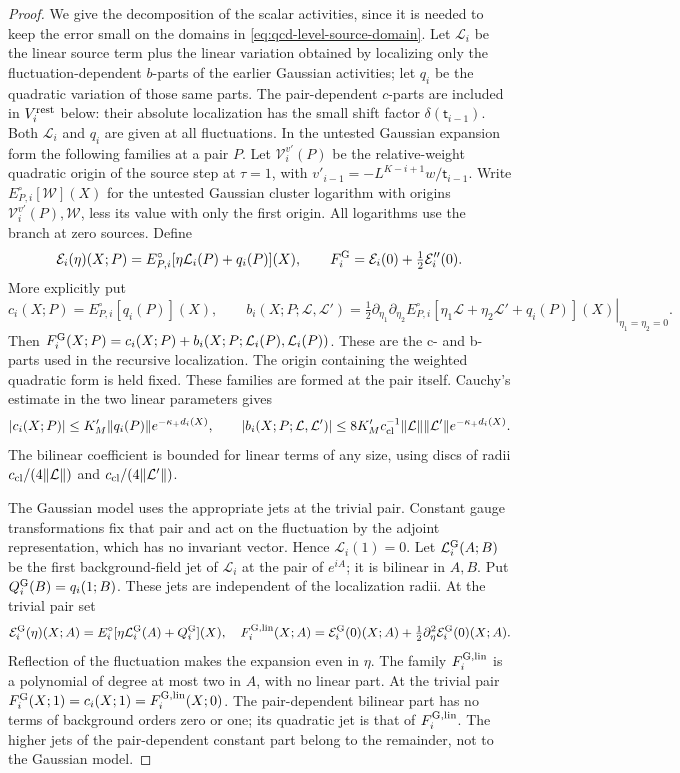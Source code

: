 \documentclass[11pt,letterpaper,reqno]{amsart}
\theoremstyle{definition}
\theoremstyle{remark}
\begin{document}
\begin{proof}
We give the decomposition of the scalar activities, since it is
needed to keep the error small on the domains in
\eqref{eq:qcd-level-source-domain}. Let $\mathcal L_i$ be the
linear source term plus the linear variation obtained by localizing
only the fluctuation-dependent $b$-parts of the earlier Gaussian
activities; let $q_i$ be the quadratic variation of those same parts.
The pair-dependent $c$-parts are included in $V_i^{\rm rest}$ below:
their absolute localization has the small shift factor
$\delta(\mathsf t_{i-1})$. Both $\mathcal L_i$ and $q_i$ are given at all
fluctuations. In the untested Gaussian expansion form
the following families at a pair $P$. Let
$\mathcal V_i^{v'}(P)$ be the relative-weight quadratic origin
of the source step at $\tau=1$, with
$v'_{i-1}=-L^{K-i+1}w/\mathsf t_{i-1}$.
Write $E^\circ_{P,i}[\mathcal W](X)$ for the untested Gaussian
cluster logarithm with origins $\mathcal V_i^{v'}(P),\mathcal W$,
less its value with only the first origin. All logarithms use
the branch at zero sources. Define
\[
 \mathcal E_i(\eta)(X;P)
 =E^\circ_{P,i}[\eta\mathcal L_i(P)+q_i(P)](X),\qquad
 F_i^{\rm G}=\mathcal E_i(0)+\tfrac12\mathcal E_i''(0).
\]
More explicitly put
\[
 c_i(X;P)=E^\circ_{P,i}[q_i(P)](X),\qquad
 b_i(X;P;\mathcal L,\mathcal L')=
 \left.\tfrac12\partial_{\eta_1}\partial_{\eta_2}
 E^\circ_{P,i}[\eta_1\mathcal L+\eta_2\mathcal L'+q_i(P)](X)
 \right|_{\eta_1=\eta_2=0}.
\]
Then $F_i^{\rm G}(X;P)=c_i(X;P)+
b_i(X;P;\mathcal L_i(P),\mathcal L_i(P))$.
These are the c- and b-parts used in the recursive localization.
The origin containing the weighted quadratic form is held fixed.
These families are formed at the pair itself. Cauchy's estimate
in the two linear parameters gives
\[
 |c_i(X;P)|\le K'_M\|q_i(P)\|e^{-\kappa_+d_i(X)},\qquad
 |b_i(X;P;\mathcal L,\mathcal L')|
  \le8K'_Mc_{\rm cl}^{-1}\|\mathcal L\|\|\mathcal L'\|
                                  e^{-\kappa_+d_i(X)}.
\]
The bilinear coefficient is bounded for linear terms of any
size, using discs of radii $c_{\rm cl}/(4\|\mathcal L\|)$
and $c_{\rm cl}/(4\|\mathcal L'\|)$.

The Gaussian model uses the appropriate jets at the trivial
pair. Constant gauge transformations fix that pair and act on
the fluctuation by the adjoint representation, which has no
invariant vector. Hence $\mathcal L_i(1)=0$. Let
$\mathcal L_i^{\rm G}(A;B)$ be the first background-field jet
of $\mathcal L_i$ at the pair of $e^{iA}$; it is bilinear in
$A,B$. Put $Q_i^{\rm G}(B)=q_i(1;B)$. These jets are
independent of the localization radii. At the trivial pair set
\[
 \mathcal E_i^{\rm G}(\eta)(X;A)
  =E_i^\circ[\eta\mathcal L_i^{\rm G}(A)+Q_i^{\rm G}](X),
 \quad
 F_i^{\rm G,lin}(X;A)
   =\mathcal E_i^{\rm G}(0)(X;A)
               +\tfrac12\partial_\eta^2\mathcal E_i^{\rm G}(0)(X;A).
\]
Reflection of the fluctuation makes the expansion even in
$\eta$. The family $F_i^{\rm G,lin}$ is a polynomial of
degree at most two in $A$, with no linear part. At the trivial
pair $F_i^{\rm G}(X;1)=c_i(X;1)=F_i^{\rm G,lin}(X;0)$.
The pair-dependent bilinear part has no terms of background
orders zero or one; its quadratic jet is that of
$F_i^{\rm G,lin}$. The higher jets of the pair-dependent
constant part belong to the remainder, not to the Gaussian
model.


\end{proof}
\end{document}

